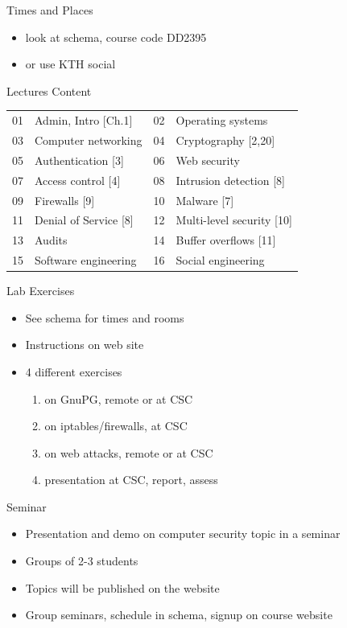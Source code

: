 \documentclass{beamer}
\begin{document}
\begin{frame}{Times and Places}
  \begin{itemize}
    \item look at schema, course code DD2395
    \item or use KTH social
  \end{itemize}
\end{frame}

\begin{frame}{Lectures Content}
  \begin{tabular}{cl|cl}
    01 & Admin, Intro [Ch.1] &
    02 & Operating systems \\
    03 & Computer networking &
    04 & Cryptography [2,20] \\
    05 & Authentication [3] &
    06 & Web security \\
    07 & Access control [4] &
    08 & Intrusion detection [8] \\
    09 & Firewalls [9] &
    10 & Malware [7] \\
    11 & Denial of Service [8] &
    12 & Multi-level security [10] \\
    13 & Audits &
    14 & Buffer overflows [11] \\
    15 & Software engineering &
    16 & Social engineering
  \end{tabular}
\end{frame}

\begin{frame}{Lab Exercises}
  \begin{itemize}
    \item See schema for times and rooms
    \item Instructions on web site
    \item 4 different exercises
      \begin{enumerate}
        \item on GnuPG, remote or at CSC
        \item on iptables/firewalls, at CSC
        \item on web attacks, remote or at CSC
        \item presentation at CSC, report, assess
      \end{enumerate}
  \end{itemize}
\end{frame}

\begin{frame}{Seminar}
  \begin{itemize}
    \item Presentation and demo on computer security 
      topic in a seminar
    \item Groups of 2-3 students
    \item Topics will be published on the website
    \item Group seminars, schedule in schema, 
      signup on course website
  \end{itemize}
\end{frame}
\end{document}
